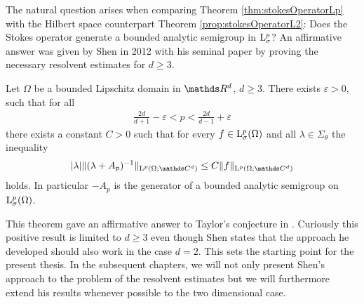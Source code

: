 The natural question arises when comparing Theorem \ref{thm:stokesOperatorLp} with the Hilbert space counterpart Theorem \ref{prop:stokesOperatorL2}: Does the Stokes operator generate a bounded analytic semigroup in $\mathrm{L}^p_\sigma$?
An affirmative answer was given by Shen in 2012 with his seminal paper \cite{Shen2012} by proving the necessary resolvent estimates for $d \geq 3$.

\begin{thm}[Shen]
  \label{thm:main}
  Let $\Omega$ be a bounded Lipschitz domain in $\R^d$, $d \geq 3$.
  There exists $\varepsilon > 0$, such that for all
  \begin{align*}
    \frac{2d}{d + 1} - \varepsilon < p < \frac{2d}{d - 1} + \varepsilon
  \end{align*}
  there exists a constant $C > 0$ such that for every $f \in \mathrm{L}^p_\sigma(\Omega)$ and all $\lambda \in \Sigma_\theta$ the inequality
  \begin{align*}
    |\lambda| \| (\lambda + A_p)^{-1} \|_{\Ell^p(\Omega; \C^d)} \leq C \|f\|_{\Ell^p(\Omega; \C^d)}
  \end{align*}
  holds. In particular $-A_p$ is the generator of a bounded analytic semigroup on $\mathrm{L}^p_\sigma(\Omega)$.
\end{thm}

This theorem gave an affirmative answer to Taylor's conjecture in \cite{taylor}. 
Curiously this positive result is limited to $d \geq 3$ even though Shen states that the approach he developed should also work in the case $d = 2$.
This sets the starting point for the present thesis.
In the subsequent chapters, we will not only present Shen's approach to the problem of the resolvent estimates but we will furthermore extend his results whenever possible to the two dimensional case.


